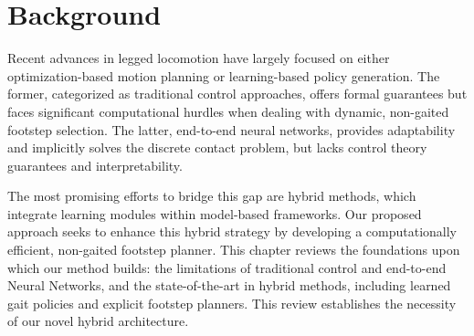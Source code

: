 \documentclass[../../main.tex]{subfiles}
\begin{document}
\chapter{Background}
\label{chap:background}

Recent advances in legged locomotion have largely focused on either
optimization-based motion planning or learning-based policy generation.
The former, categorized as traditional control approaches,
offers formal guarantees but faces significant computational hurdles
when dealing with dynamic, non-gaited footstep selection. The latter,
end-to-end neural networks, provides adaptability and implicitly
solves the discrete contact problem, but lacks control theory guarantees
and interpretability.

The most promising efforts to bridge this gap are hybrid methods,
which integrate learning modules within model-based frameworks. Our
proposed approach seeks to enhance this hybrid strategy by developing a
computationally efficient, non-gaited footstep planner. This chapter
reviews the foundations upon which our method builds: the limitations of
traditional control and end-to-end Neural Networks, and the
state-of-the-art in hybrid methods, including learned gait policies and
explicit footstep planners. This review establishes the necessity of
our novel hybrid architecture.





\end{document}
